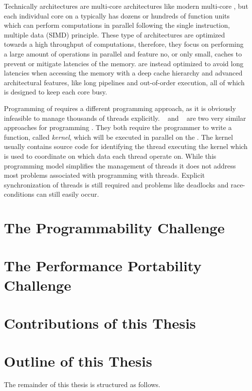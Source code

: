 Technically \GPU architectures are multi-core architectures like modern multi-core \CPUs, but each individual core on a \GPU typically has dozens or hundreds of function units which can perform computations in parallel following the single instruction, multiple data (SIMD) principle.
These type of architectures are optimized towards a high throughput of computations, therefore, they focus on performing a large amount of operations in parallel and feature no, or only small, caches to prevent or mitigate latencies of the memory.
\CPUs are instead optimized to avoid long latencies when accessing the memory with a deep cache hierarchy and advanced architectural features, like long pipelines and out-of-order execution, all of which is designed to keep each core busy.

Programming of \GPUs requires a different programming approach, as it is obviously infeasible to manage thousands of threads explicitly.
\CUDA~\cite{} and \OpenCL~\cite{} are two very similar approaches for programming \GPUs.
They both require the programmer to write a function, called \emph{kernel}, which will be executed in parallel on the \GPU.
The kernel usually contains source code for identifying the thread executing the kernel which is used to coordinate on which data each thread operate on.
While this programming model simplifies the management of threads it does not address most problems associated with programming with threads.
Explicit synchronization of threads is still required and problems like deadlocks and race-conditions can still easily occur.

\section{The Programmability Challenge}


\section{The Performance Portability Challenge}

\section{Contributions of this Thesis}

\section{Outline of this Thesis}
The remainder of this thesis is structured as follows.

